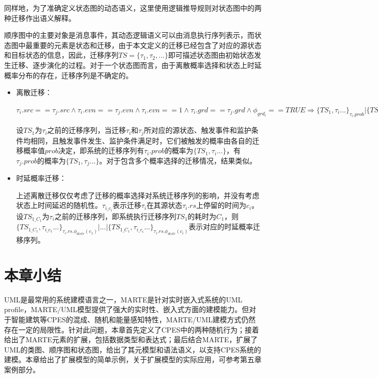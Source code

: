 	同样地，为了准确定义状态图的动态语义，这里使用逻辑推导规则对状态图中的两种迁移作出语义解释。
	
	顺序图中的主要对象是消息事件，其动态逻辑语义可以由消息执行序列表示，而状态图中最重要的元素是状态和迁移，由于本文定义的迁移已经包含了对应的源状态和目标状态的信息，因此，迁移序列$TS=\{ \tau_{1},\tau_{2},...  \}$即可描述状态图由初始状态发生迁移、逐步演化的过程。对于一个状态图而言，由于离散概率选择和状态上时延概率分布的存在，迁移序列是不确定的。
	
	\begin{itemize}
	\item 离散迁移：
	
	$ \tau_{i}.src==\tau_{j}.src \wedge \tau_{i}.evn==\tau_{j}.evn \wedge \tau_{i}.evn==1 \wedge \tau_{i}.grd==\tau_{j}.grd \wedge \phi_{grd_{i}}==TRUE \Longrightarrow \{ TS_{1},\tau_{i}... \}_{\tau_{i}.prob} | \{ TS_{1},\tau_{j}... \}_{\tau_{j}.prob}$ 
	
	设$TS_{1}$为$\tau_{i}$之前的迁移序列，当迁移$\tau_{i}$和$\tau_{j}$所对应的源状态、触发事件和监护条件均相同，且触发事件发生、监护条件满足时，它们被触发的概率由各自的迁移概率值$prob$决定，即系统的迁移序列有$\tau_{i}.prob$的概率为$\{ TS_{1},\tau_{i}... \}$，有$\tau_{j}.prob$的概率为$\{ TS_{1},\tau_{j}... \}$。对于包含多个概率选择的迁移情况，结果类似。
	\item 时延概率迁移：
	
	上述离散迁移仅仅考虑了迁移的概率选择对系统迁移序列的影响，并没有考虑状态上时间延迟的随机性。$\tau_{i\_c_{i}}$表示迁移$\tau_{i}$在其源状态$\tau_{i}.rs$上停留的时间为$c_{i}$。
	设$TS_{1\_C_{1}}$为$\tau_{i}$之前的迁移序列，即系统执行迁移序列$TS_{1}$的耗时为$C_{1}$，则$\{TS_{1\_C_{1}},\tau_{i\_c_{1}}...\}_{\tau_{i}.rs.\phi_{distr}(c_{1})} | ... | \{TS_{1\_C_{1}},\tau_{i\_c_{i}}...\}_{\tau_{i}.rs.\phi_{distr}(c_{i})}$表示对应的时延概率迁移序列。
	\end{itemize}
	
\section{本章小结}
	UML是最常用的系统建模语言之一，MARTE是针对实时嵌入式系统的UML profile，MARTE/UML模型提供了强大的实时性、嵌入式方面的建模能力。但对于智能建筑等CPES的混成、随机和能量感知特性，MARTE/UML建模方式仍然存在一定的局限性。针对此问题，本章首先定义了CPES中的两种随机行为；接着给出了MARTE元素的扩展，包括数据类型和表达式；最后结合MARTE，扩展了UML的类图、顺序图和状态图，给出了其元模型和语法语义，以支持CPES系统的建模。本章给出了扩展模型的简单示例，关于扩展模型的实际应用，可参考第五章案例部分。
	


